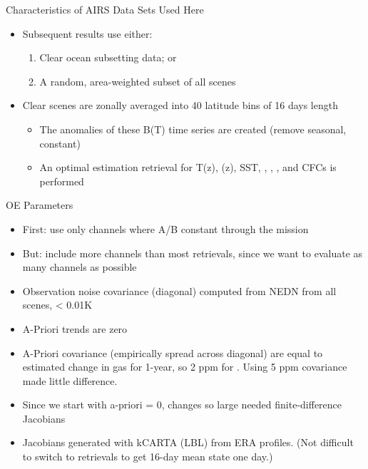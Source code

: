 \documentclass[10pt,t]{beamer}
\begin{document}
\begin{frame}[label={sec:orged789e2},shrink=20]{Characteristics of AIRS Data Sets Used Here}
\begin{itemize}
\item Subsequent results use either:
\begin{enumerate}
\item Clear ocean subsetting data; or
\item A random, area-weighted subset of all scenes
\end{enumerate}
\item Clear scenes are zonally averaged into 40 latitude bins of 16 days length
\begin{itemize}
\item The anomalies of these B(T) time series are created (remove seasonal, constant)
\item An optimal estimation retrieval for T(z), \water(z), SST, \cd, \methane, \nitrous, and CFCs is performed
\end{itemize}
\end{itemize}

\begin{block}{OE Parameters}
\begin{itemize}
\item First: use only channels where A/B constant through the mission
\item But: include more channels than most retrievals, since we want to evaluate as many channels as possible
\item Observation noise covariance (diagonal) computed from NEDN from all scenes, < 0.01K
\item A-Priori trends are zero
\item A-Priori covariance (empirically spread across diagonal) are equal to estimated change in gas for 1-year, so 2 ppm for \cd.  Using 5 ppm covariance made little difference.
\item Since we start with a-priori = 0, \cd changes so large needed finite-difference Jacobians
\item Jacobians generated with kCARTA (LBL) from ERA profiles.  (Not difficult to switch to retrievals to get 16-day mean state one day.)
\end{itemize}
\end{block}
\end{frame}
\end{document}
